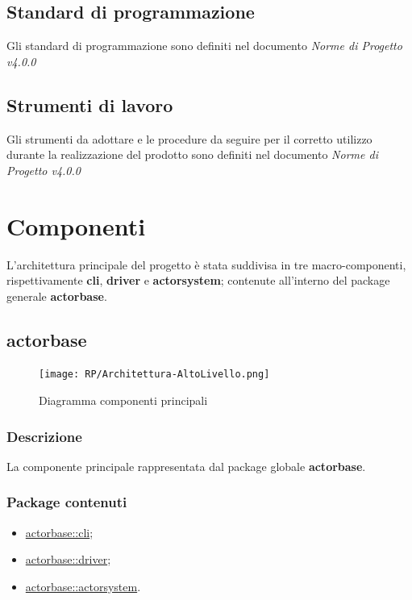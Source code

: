 \documentclass{scalatekids-article}
\begin{document}
\subsection{Standard di programmazione}
Gli standard di programmazione sono definiti nel documento \textit{Norme di Progetto v4.0.0}

\subsection{Strumenti di lavoro}
Gli strumenti da adottare e le procedure da seguire per il corretto utilizzo
durante la realizzazione del prodotto sono definiti nel documento \textit{Norme
  di Progetto v4.0.0}

\section{Componenti}

L'architettura principale del progetto è stata suddivisa in tre macro-componenti, rispettivamente
\textbf{cli}, \textbf{driver} e \textbf{actorsystem}; contenute all'interno del package
generale \textbf{actorbase}.

\subsection{actorbase}
\label{sec:actorbase}

\begin{figure}[H]
  \begin{center}
    \texttt{[image: RP/Architettura-AltoLivello.png]}
    \caption{Diagramma componenti principali}
  \end{center}
\end{figure}

\subsubsection{Descrizione}

La componente principale rappresentata dal package globale \textbf{actorbase}.

\subsubsection{Package contenuti}

\begin{itemize}
\item \hyperref[sec:actorbase::cli]{actorbase::cli};
\item \hyperref[sec:actorbase::driver]{actorbase::driver};
\item \hyperref[sec:actorbase::actorsystem]{actorbase::actorsystem}.
\end{itemize}
\end{document}
